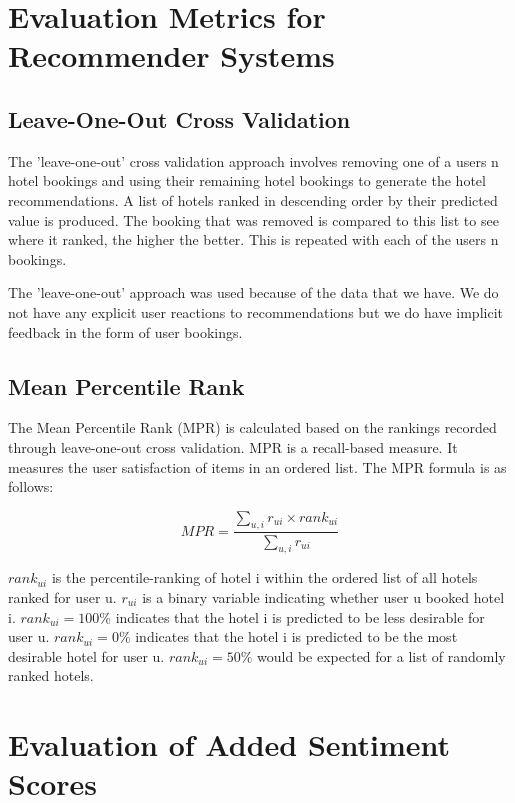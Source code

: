 \section{Evaluation Metrics for Recommender Systems}

\subsection{Leave-One-Out Cross Validation}

The 'leave-one-out' cross validation approach involves removing one of a users n hotel bookings and using their remaining hotel bookings to generate the hotel recommendations. A list of hotels ranked in descending order by their predicted value is produced. The booking that was removed is compared to this list to see where it ranked, the higher the better. This is repeated with each of the users n bookings.

The 'leave-one-out' approach was used because of the data that we have. We do not have any explicit user reactions to recommendations but we do have implicit feedback in the form of user bookings. 

\subsection{Mean Percentile Rank}

The Mean Percentile Rank (MPR) is calculated based on the rankings recorded through leave-one-out cross validation. MPR is a recall-based measure. It measures the user satisfaction of items in an ordered list. The MPR formula is as follows:

\begin{equation}
    MPR = \frac{ \sum_{u,i} r_{ui} \times rank_{ui} } {\sum_{u,i} r_{ui}}
\end{equation}

$rank_{ui}$ is the percentile-ranking of hotel i within the ordered list of all hotels ranked for user u. $r_{ui}$ is a binary variable indicating whether user u booked hotel i. $rank_{ui} = 100\%$ indicates that the hotel i is predicted to be less desirable for user u. $rank_{ui} = 0\%$ indicates that the hotel i is predicted to be the most desirable hotel for user u. $rank_{ui} = 50\%$ would be expected for a list of randomly ranked hotels.

\section{Evaluation of Added Sentiment Scores}

